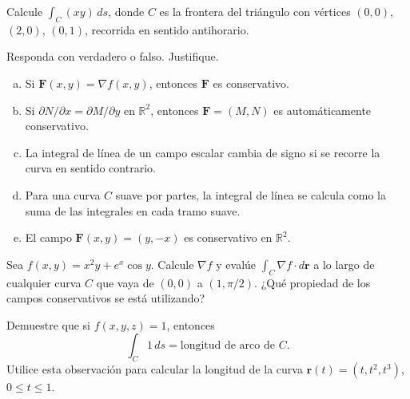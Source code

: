 \begin{prob}
Calcule \(\displaystyle \int_C (xy)\,ds\), donde \(C\) es la frontera
del triángulo con vértices \((0,0)\), \((2,0)\), \((0,1)\), recorrida
en sentido antihorario.
\end{prob}

\begin{prob}
Responda con verdadero o falso. Justifique.
\begin{enumerate}[a)]
  \item Si \(\mathbf{F}(x,y) = \nabla f(x,y)\), entonces
  \(\mathbf{F}\) es conservativo.
  \item Si \(\partial N/\partial x = \partial M/\partial y\) en
  \(\mathbb{R}^2\), entonces \(\mathbf{F} = (M,N)\) es
  automáticamente conservativo.
  \item La integral de línea de un campo escalar cambia de signo
  si se recorre la curva en sentido contrario.
  \item Para una curva \(C\) suave por partes, la integral de línea
  se calcula como la suma de las integrales en cada tramo suave.
  \item El campo \(\mathbf{F}(x,y) = (y, -x)\) es conservativo en
  \(\mathbb{R}^2\).
\end{enumerate}
\end{prob}

\begin{prob}
Sea \(f(x,y) = x^2 y + e^x \cos y\). Calcule \(\nabla f\) y evalúe
\(\displaystyle \int_C \nabla f \cdot d\mathbf{r}\) a lo largo de
cualquier curva \(C\) que vaya de \((0,0)\) a \((1,\pi/2)\).
¿Qué propiedad de los campos conservativos se está utilizando?
\end{prob}

\begin{prob}
Demuestre que si \(f(x,y,z) = 1\), entonces
\[
\int_C 1\,ds = \text{longitud de arco de } C.
\]
Utilice esta observación para calcular la longitud de la curva
\(\mathbf{r}(t) = (t, t^2, t^3)\), \(0\le t\le 1\).
\end{prob}